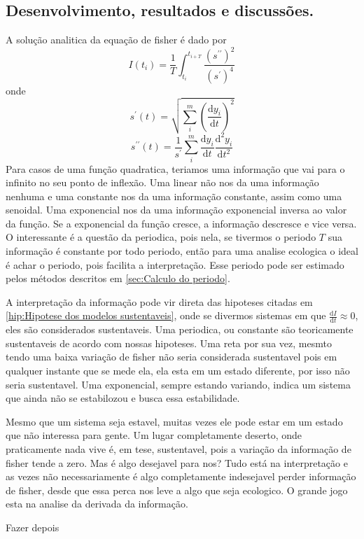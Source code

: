 \subsection{Desenvolvimento, resultados e discussões.}
A solução analitica da equação de fisher é dado por
\begin{equation}
    I(t_i)=\frac{1}{T}\int_{t_i}^{t_{i+T}} \frac{(s^{\prime\prime})^{2} }{(s^\prime)^4 }
\end{equation}
onde
\begin{equation}
    s^\prime (t)=\sqrt{\sum_{i}^m(\frac{\mathrm{d}y_i}{\mathrm{d}t} )^{2} } 
\end{equation}
\begin{equation}
    s^{\prime\prime}(t)=\frac{1}{s^\prime }\sum_{i}^m\frac{\mathrm{d}y_i}{\mathrm{d}t} \frac{\mathrm{d}^{2} y_i}{\mathrm{d}t^{2}}
\end{equation}
Para casos de uma função quadratica, teriamos uma informação que vai para o infinito no seu ponto de
inflexão. Uma linear não nos da uma informação nenhuma e uma constante nos da uma informação
constante, assim como uma senoidal. Uma exponencial nos da uma informação exponencial inversa ao
valor da função. Se a exponencial da função cresce, a informação descresce e vice versa. O
interessante é a questão da periodica, pois nela, se tivermos o periodo \(T\) sua informação é
constante por todo periodo, então para uma analise ecologica o ideal é achar o periodo, pois
facilita a interpretação. Esse periodo pode ser estimado pelos métodos descritos em \ref{sec:Calculo
do periodo}. \par

A interpretação da informação pode vir direta das hipoteses citadas em \ref{hip:Hipotese dos modelos
sustentaveis}, onde se divermos sistemas em que \(\frac{\mathrm{d}I}{\mathrm{d}t} \approx 0\), eles
são considerados sustentaveis. Uma periodica, ou constante são teoricamente sustentaveis
de acordo com nossas hipoteses. Uma reta por sua vez, mesmto tendo uma baixa variação de fisher
não seria considerada sustentavel pois em qualquer instante que se mede ela, ela esta em um estado
diferente, por isso não seria sustentavel. Uma exponencial, sempre estando variando, indica um
sistema que ainda não se estabilozou e busca essa estabilidade. \par

Mesmo que um sistema seja estavel, muitas vezes ele pode estar em um estado que não interessa para
gente. Um lugar completamente deserto, onde praticamente nada vive é, em tese, sustentavel, pois a
variação da informação de fisher tende a zero. Mas é algo desejavel para nos? Tudo está na
interpretação e as vezes não necessariamente é algo completamente indesejavel perder informação de
fisher, desde que essa perca nos leve a algo que seja ecologico. O grande jogo esta na analise da
derivada da informação. \par

Fazer depois